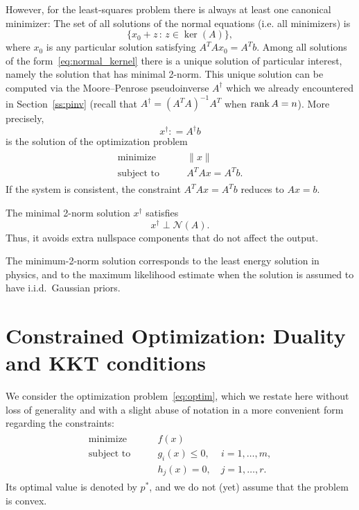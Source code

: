 However, for the least-squares problem there is always at least one canonical minimizer: The set of all solutions of the normal equations (i.e. all minimizers) is
\begin{equation}\label{eq:normal_kernel}
\{x_0 + z \,:\,z\in\ker(A)\},
\end{equation}
where $x_0$ is any particular solution satisfying $A^T A x_0 = A^T b$. Among all solutions of the form~\eqref{eq:normal_kernel} there is a unique solution of particular interest, namely the solution that has minimal 2-norm. This unique solution can be computed via  the Moore–Penrose pseudoinverse $A^\dagger$ which we already encountered in Section~\ref{ss:pinv} (recall that  $A^\dagger = (A^T A)^{-1}A^T$ when $\operatorname{rank} A = n$). More precisely,
$$
x^\dagger: = A^\dagger b
$$
is the solution of the optimization problem
\begin{align}\label{eq:optimpinv}
\begin{split}
 \text{minimize} & \qquad   \|x\|  \\
 \text{subject to} & \qquad A^T A x = A^T b.
\end{split}
\end{align}
If the system is consistent, the constraint $A^T A x = A^T b$ reduces to $Ax = b$.

The minimal 2-norm solution $x^\dagger$ satisfies
$$ x^\dagger \perp {\mathcal N}(A).$$
Thus, it avoids extra nullspace components that do not affect the output.

The minimum-2-norm solution corresponds to the least energy solution in physics, and to the
maximum likelihood estimate when the solution is assumed to have i.i.d.\ Gaussian priors. 



\section{Constrained Optimization: Duality and KKT conditions} %
\label{s:duality}




We consider the optimization problem~\eqref{eq:optim}, which we restate here without loss of generality and with a slight abuse of notation in a  more convenient form regarding the constraints:
\begin{align}\label{eq:optim4}
\begin{split}
 \text{minimize} & \qquad   f(x)  \\
 \text{subject to} & \qquad g_i(x) \le 0, \quad \, i = 1, \dots, m, \\
 & \qquad h_j(x) = 0, \quad j=1,\dots,r. 
\end{split}
\end{align}
Its optimal value is denoted by $p^*$, and
we do not (yet) assume that the problem is convex.


